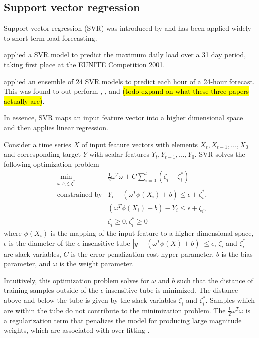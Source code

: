 \subsection{Support vector regression}
Support vector regression (SVR) was introduced by \citet{Drucker1996} and has been applied widely to short-term load forecasting.
\par
\citet{Chen2004} applied a SVR model to predict the maximum daily load over a 31 day period, taking first place at the EUNITE Competition 2001.
\par
\citet{Ceperic2013} applied an ensemble of 24 SVR models to predict each hour of a 24-hour forecast.
This was found to out-perform \citet{RochaReis2005}, \citet{AMJADY2009}, and \citet{Deihimi2012} \hl{(todo expand on what these three papers actually are)}.
\par
In essence, SVR maps an input feature vector into a higher dimensional space and then applies linear regression.
\par
Consider a time series $X$ of input feature vectors with elements $X_{t}, X_{t-1}, ..., X_{0}$ and corresponding target $Y$ with scalar features $Y_{t}, Y_{t-1}, ..., Y_{0}$. SVR solves the following optimization problem
\begin{align}
& \min\limits_{\omega,b,\zeta,\zeta^{*}} & \frac{1}{2}\omega^T\omega + C\sum_{i=0}^{t}(\zeta_i+\zeta_i^*) \\
& \text{constrained by} & Y_i - (\omega^T\phi(X_i) + b) \leq \epsilon + \zeta_i^*,	\nonumber \\
                       && (\omega^T\phi(X_i)+b)-Y_i\leq\epsilon+\zeta_i,	\nonumber \\
                       && \zeta_i \geq 0, \zeta_i^* \geq 0 \nonumber
\end{align}
where $\phi(X_i)$ is the mapping of the input feature to a higher dimensional space, $\epsilon$ is the diameter of the $\epsilon$-insensitive tube $|y - (\omega^T\phi(X) + b)| \leq \epsilon$, $\zeta_i$ and $\zeta_i^*$ are slack variables, $C$ is the error penalization cost hyper-parameter, $b$ is the bias parameter, and $\omega$ is the weight parameter.
\par
Intuitively, this optimization problem solves for $\omega$ and  $b$ such that the distance of training samples outside of the $\epsilon$-insensitive tube is minimized. The distance above and below the tube is given by the slack variables $\zeta_i$ and $\zeta_i^*$. Samples which are within the tube do not contribute to the minimization problem. The $\frac{1}{2}\omega^T\omega$ is a regularization term that penalizes the model for producing large magnitude weights, which are associated with over-fitting \citep{Drucker1996}.
